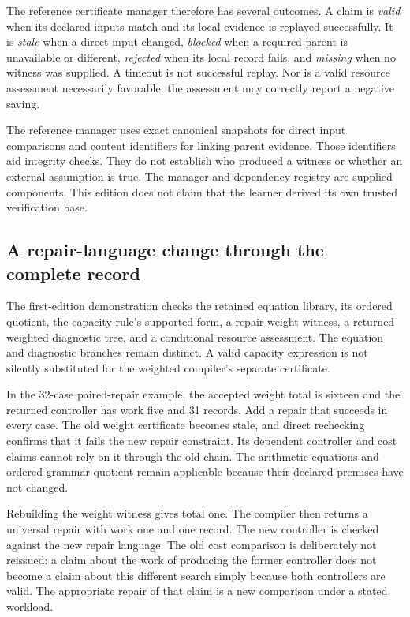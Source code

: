 The reference certificate manager therefore has several outcomes. A claim is \emph{valid} when its declared inputs match and its local evidence is replayed successfully. It is \emph{stale} when a direct input changed, \emph{blocked} when a required parent is unavailable or different, \emph{rejected} when its local record fails, and \emph{missing} when no witness was supplied. A timeout is not successful replay. Nor is a valid resource assessment necessarily favorable: the assessment may correctly report a negative saving.

The reference manager uses exact canonical snapshots for direct input comparisons and content identifiers for linking parent evidence. Those identifiers aid integrity checks. They do not establish who produced a witness or whether an external assumption is true. The manager and dependency registry are supplied components. This edition does not claim that the learner derived its own trusted verification base.

\subsection{A repair-language change through the complete record}
The first-edition demonstration checks the retained equation library, its ordered quotient, the capacity rule's supported form, a repair-weight witness, a returned weighted diagnostic tree, and a conditional resource assessment. The equation and diagnostic branches remain distinct. A valid capacity expression is not silently substituted for the weighted compiler's separate certificate.

In the 32-case paired-repair example, the accepted weight total is sixteen and the returned controller has work five and 31 records. Add a repair that succeeds in every case. The old weight certificate becomes stale, and direct rechecking confirms that it fails the new repair constraint. Its dependent controller and cost claims cannot rely on it through the old chain. The arithmetic equations and ordered grammar quotient remain applicable because their declared premises have not changed.

Rebuilding the weight witness gives total one. The compiler then returns a universal repair with work one and one record. The new controller is checked against the new repair language. The old cost comparison is deliberately not reissued: a claim about the work of producing the former controller does not become a claim about this different search simply because both controllers are valid. The appropriate repair of that claim is a new comparison under a stated workload.

